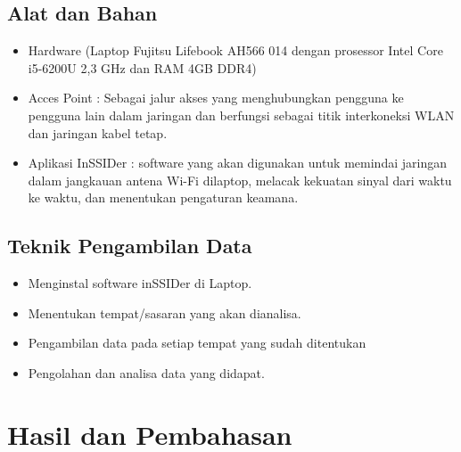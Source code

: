 \documentclass[conference]{IEEEtran}
\begin{document}
\subsection{Alat dan Bahan}
\begin{itemize}
    \item  Hardware (Laptop Fujitsu Lifebook AH566 014 dengan prosessor Intel Core i5-6200U 2,3 GHz dan RAM 4GB DDR4)
    \item  Acces Point : Sebagai jalur akses yang menghubungkan pengguna ke pengguna lain dalam jaringan dan berfungsi sebagai titik interkoneksi WLAN dan jaringan kabel tetap.
    \item Aplikasi InSSIDer : software yang akan digunakan untuk memindai jaringan dalam jangkauan antena Wi-Fi dilaptop, melacak kekuatan sinyal dari waktu ke waktu, dan menentukan pengaturan keamana.
\end{itemize}
\subsection{Teknik Pengambilan Data}
\begin{itemize}
    \item  Menginstal software inSSIDer di Laptop.
    \item Menentukan tempat/sasaran yang akan dianalisa.
    \item Pengambilan data pada setiap tempat yang sudah ditentukan
    \item Pengolahan dan analisa data yang didapat.
\end{itemize}
\vspace{2cm}

\section{Hasil dan Pembahasan}
\vspace{0.2cm}
\end{document}
